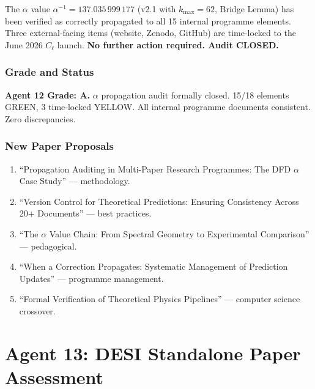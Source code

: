 \documentclass[11pt,a4paper]{article}
\begin{document}
\begin{tcolorbox}[colback=green!5!white,colframe=green!40!black,title=$\alpha$ Propagation Audit: CLOSED]
The $\alpha$ value $\alpha^{-1} = 137.035\,999\,177$ (v2.1 with $k_{\max} = 62$, Bridge Lemma) has been verified as correctly propagated to all 15 internal programme elements. Three external-facing items (website, Zenodo, GitHub) are time-locked to the June 2026 $C_\ell$ launch. \textbf{No further action required. Audit CLOSED.}
\end{tcolorbox}

\section{Grade and Status}

\begin{tcolorbox}[colback=green!5!white,colframe=green!40!black]
\textbf{Agent 12 Grade: A.} $\alpha$ propagation audit formally closed. 15/18 elements GREEN, 3 time-locked YELLOW. All internal programme documents consistent. Zero discrepancies.
\end{tcolorbox}

\section{New Paper Proposals}

\begin{enumerate}
\item ``Propagation Auditing in Multi-Paper Research Programmes: The DFD $\alpha$ Case Study'' --- methodology.
\item ``Version Control for Theoretical Predictions: Ensuring Consistency Across 20+ Documents'' --- best practices.
\item ``The $\alpha$ Value Chain: From Spectral Geometry to Experimental Comparison'' --- pedagogical.
\item ``When a Correction Propagates: Systematic Management of Prediction Updates'' --- programme management.
\item ``Formal Verification of Theoretical Physics Pipelines'' --- computer science crossover.
\end{enumerate}


\part{Agent 13: DESI Standalone Paper Assessment}
\label{part:desi-standalone}
\end{document}
